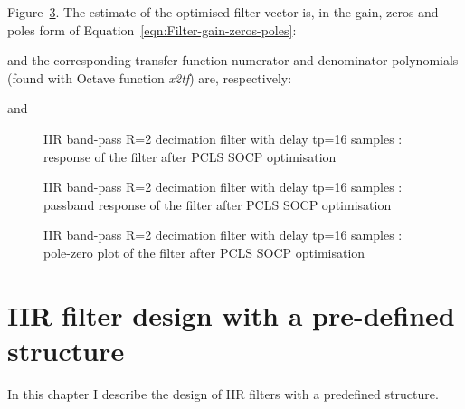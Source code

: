 \documentclass[a4paper,twoside,10pt,english]{report}
\begin{document}
Figure~\ref{fig:iir-socp-slb-bandpass-test-pcls-d1-pz}. The estimate of the
optimised filter vector is, in the gain, zeros and poles form of
Equation~\ref{eqn:Filter-gain-zeros-poles}:
\begin{small}

\end{small}
and the corresponding transfer function numerator and denominator polynomials
(found with Octave function \emph{x2tf}) are, respectively:
\begin{small}

\end{small}
and
\begin{small}

\end{small}
\begin{figure}[!htbp]
\begin{center}
\scalebox{0.7}{}
\caption{IIR band-pass R=2 decimation filter with delay tp=16 samples : response
of the filter after PCLS SOCP optimisation}
\label{fig:iir-socp-slb-bandpass-test-pcls-d1}
\end{center}
\end{figure}
\begin{figure}[!htbp]
\begin{center}
\scalebox{0.7}{}
\caption{IIR band-pass R=2 decimation filter with delay tp=16 samples : passband
  response of the filter after PCLS SOCP optimisation}
\label{fig:iir-socp-slb-bandpass-test-pcls-d1-passband}
\end{center}
\end{figure}
\begin{figure}[!htbp]
\begin{center}
\scalebox{0.7}{}
\caption{IIR band-pass R=2 decimation filter with delay tp=16 samples :
pole-zero plot of the filter after PCLS SOCP optimisation}
\label{fig:iir-socp-slb-bandpass-test-pcls-d1-pz}
\end{center}
\end{figure}
\cleardoublepage{}
\chapter{\label{sec:IIR-Filter-Design-With-Predefined-Structure}IIR filter design with a pre-defined structure}
In this chapter I describe the design of IIR filters with a predefined structure.
\end{document}
